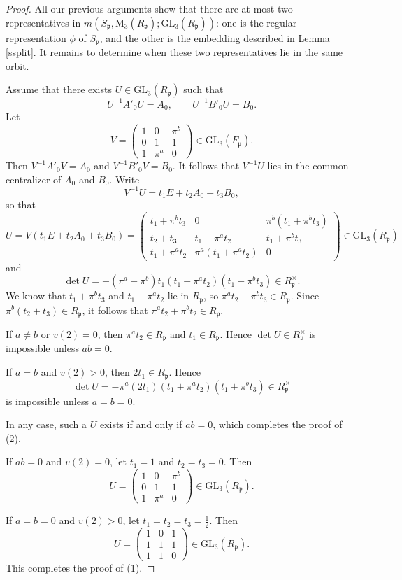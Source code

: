 \documentclass[12pt]{article}
\theoremstyle{plain}
\theoremstyle{definition}
\theoremstyle{remark}
\begin{document}
\begin{proof}
All our previous arguments show that there are at most two representatives in $m(S_\mathfrak{p},\mathrm{M}_3(R_\mathfrak{p});\mathrm{GL}_3(R_\mathfrak{p}))$: one is the regular representation $\phi$ of $S_\mathfrak{p}$, and the other is the embedding described in Lemma \ref{ssplit}. It remains to determine when these two representatives lie in the same orbit.

Assume that there exists $U\in \mathrm{GL}_3(R_\mathfrak{p})$ such that
$$U^{-1}A'_0 U = A_0,\qquad U^{-1}B'_0 U = B_0.$$
Let
$$
V=\begin{pmatrix}
1 & 0 & \pi^b \\
0 & 1 & 1 \\
1 & \pi^a & 0
\end{pmatrix}\in \mathrm{GL}_3(F_\mathfrak{p}).
$$
Then $V^{-1}A'_0V=A_0$ and $V^{-1}B'_0V=B_0$. It follows that $V^{-1}U$ lies in the common centralizer of $A_0$ and $B_0$. Write
$$
V^{-1}U=t_1E+t_2A_0+t_3B_0,
$$
so that
$$
U=V(t_1E+t_2A_0+t_3B_0)=\begin{pmatrix}
t_1 + \pi^{b} t_3 & 0 & \pi^{b}(t_1 + \pi^{b} t_3) \\
t_2 + t_3 & t_1 + \pi^{a} t_2 & t_1 + \pi^{b} t_3 \\
t_1 + \pi^{a} t_2 & \pi^{a}(t_1 + \pi^{a} t_2) & 0
\end{pmatrix}\in \mathrm{GL}_3(R_\mathfrak{p})
$$
and
$$
\det U=-(\pi^a+\pi^b)t_1(t_1 + \pi^{a} t_2)(t_1 + \pi^{b} t_3)\in R_\mathfrak{p}^\times.
$$
We know that $t_1 + \pi^{b} t_3$ and $t_1 + \pi^{a} t_2$ lie in $R_\mathfrak{p}$, so $\pi^{a} t_2-\pi^{b} t_3 \in R_\mathfrak{p}$. Since $\pi^b(t_2+t_3)\in R_\mathfrak{p}$, it follows that $\pi^{a} t_2+\pi^{b} t_2 \in R_\mathfrak{p}$.

If $a\neq b$ or $v(2)=0$, then $\pi^a t_2\in R_\mathfrak{p}$ and $t_1\in R_\mathfrak{p}$. Hence $\det U\in R_\mathfrak{p}^\times$ is impossible unless $ab=0$.

If $a=b$ and $v(2)>0$, then $2t_1\in R_\mathfrak{p}$. Hence
$$
\det U=-\pi^a(2t_1)(t_1 + \pi^{a} t_2)(t_1 + \pi^{b} t_3)\in R_\mathfrak{p}^\times
$$
is impossible unless $a=b=0$.

In any case, such a $U$ exists if and only if $ab=0$, which completes the proof of (2).

If $ab=0$ and $v(2)=0$, let $t_1=1$ and $t_2=t_3=0$. Then
$$
U=\begin{pmatrix}
1 & 0 & \pi^{b} \\
0 & 1 & 1 \\
1 & \pi^{a} & 0
\end{pmatrix}\in \mathrm{GL}_3(R_\mathfrak{p}).
$$

If $a=b=0$ and $v(2)>0$, let $t_1=t_2=t_3=\frac{1}{2}$. Then
$$
U=\begin{pmatrix}
1 & 0 & 1 \\
1 & 1 & 1 \\
1 & 1 & 0
\end{pmatrix}\in \mathrm{GL}_3(R_\mathfrak{p}).
$$
This completes the proof of (1).
\end{proof}
\end{document}
